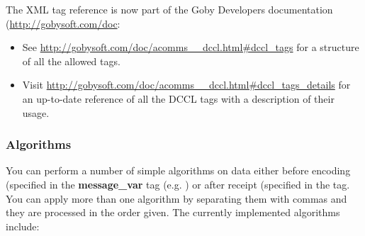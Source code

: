 The XML tag reference is now part of the Goby Developers documentation (\url{http://gobysoft.com/doc}:
\begin{itemize}
\item See \url{http://gobysoft.com/doc/acomms__dccl.html#dccl_tags} for a structure of all the allowed tags.
\item Visit \url{http://gobysoft.com/doc/acomms__dccl.html#dccl_tags_details} for an up-to-date reference of all the DCCL tags with a description of their usage.
\end{itemize}  

\subsubsection{Algorithms}
You can perform a number of simple algorithms on data either before encoding (specified in the \textbf{message\_var} tag (e.g. ) or after receipt (specified in the  tag. You can apply more than one algorithm by separating them with commas and they are processed in the order given. The currently implemented algorithms include:
